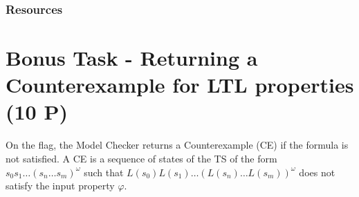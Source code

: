 \subsubsection*{Resources}
\cite[Paragraph 5.2.2]{BaKa}


\section{Bonus Task - Returning a Counterexample for LTL properties (10 P)} \label{sec::bonus2}
On the  flag, the Model Checker returns a Counterexample (CE) if the formula is 
not satisfied. A CE is a sequence of states of the TS of the form $s_0s_1 \dots (s_n \dots s_m )^{\omega}$
such that $L(s_0)L(s_1) \dots (L(s_n) \dots L(s_m) )^{\omega}$ does not satisfy the input property $\varphi$.